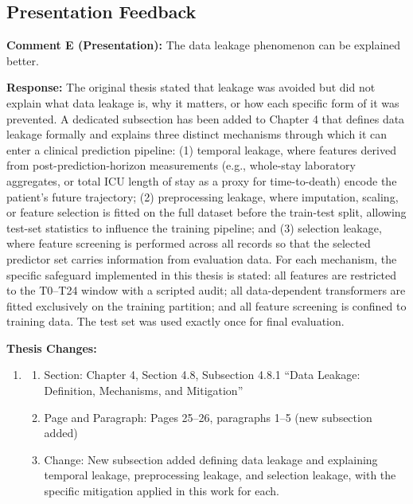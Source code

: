 \documentclass[12pt,a4paper]{article}
\begin{document}
\begin{flushleft}
\vspace{\baselineskip}


\subsection*{Presentation Feedback}

\vspace{\baselineskip}

\textbf{Comment E (Presentation):} The data leakage phenomenon can be explained better.

\vspace{\baselineskip}

\textbf{Response:} The original thesis stated that leakage was avoided but did not explain what data leakage is, why it matters, or how each specific form of it was prevented. A dedicated subsection has been added to Chapter 4 that defines data leakage formally and explains three distinct mechanisms through which it can enter a clinical prediction pipeline: (1) temporal leakage, where features derived from post-prediction-horizon measurements (e.g., whole-stay laboratory aggregates, or total ICU length of stay as a proxy for time-to-death) encode the patient's future trajectory; (2) preprocessing leakage, where imputation, scaling, or feature selection is fitted on the full dataset before the train-test split, allowing test-set statistics to influence the training pipeline; and (3) selection leakage, where feature screening is performed across all records so that the selected predictor set carries information from evaluation data. For each mechanism, the specific safeguard implemented in this thesis is stated: all features are restricted to the T0--T24 window with a scripted audit; all data-dependent transformers are fitted exclusively on the training partition; and all feature screening is confined to training data. The test set was used exactly once for final evaluation.

\vspace{\baselineskip}

\textbf{Thesis Changes:}
\begin{enumerate}
    \item
    \begin{enumerate}
        \item Section: Chapter 4, Section 4.8, Subsection 4.8.1 ``Data Leakage: Definition, Mechanisms, and Mitigation''
        \item Page and Paragraph: Pages 25--26, paragraphs 1--5 (new subsection added)
        \item Change: New subsection added defining data leakage and explaining temporal leakage, preprocessing leakage, and selection leakage, with the specific mitigation applied in this work for each.
    \end{enumerate}
\end{enumerate}


\end{flushleft}
\end{document}
